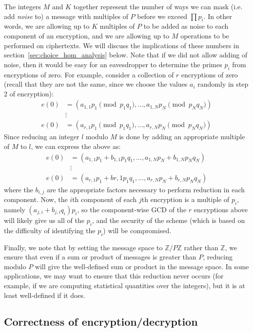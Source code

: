 \documentclass[11pt]{report}
\newcommand{\Z}{\mathbb{Z}}
\begin{document}
The integers $M$ and $K$ together represent the number of ways we can mask (i.e. add \emph{noise} to) a message with multiples of $P$ before we exceed $\prod p_i$. In other words, we are allowing up to $K$ multiples of $P$ to be added as noise to each component of an encryption, and we are allowing up to $M$ operations to be performed on ciphertexts. We will discuss the implications of these numbers in section~\ref{sec:choice_hom_analysis} below. Note that if we did not allow adding of noise, then it would be easy for an eavesdropper to determine the primes $p_i$ from encryptions of zero. For example, consider a collection of $r$ encryptions of zero (recall that they are not the same, since we choose the values $a_i$ randomly in step 2 of encryption):
\begin{align*}
e(0) &=  (a_{1,1}p_1 \pmod{p_1q_1},\dots,a_{1,N}p_N \pmod{p_Nq_N}) \\
\ &\vdots \ \\
e(0) &= (a_{r,1}p_1 \pmod{p_1q_1},\dots,a_{r,N}p_N \pmod{p_Nq_N})
\end{align*}
\noindent Since reducing an integer $l$ modulo $M$ is done by adding an appropriate multiple of $M$ to $l$, we can express the above as:
\begin{align*}
e(0) &= (a_{1,1}p_1+b_{1,1}p_1q_1,\dots,a_{1,N}p_N + b_{1,N}p_Nq_N) \\
\ &\vdots \\
e(0) &= (a_{r,1}p_1 + b{r,1}p_1q_1,\dots,a_{r,N}p_N + b_{r,N}p_Nq_N)
\end{align*}
\noindent where the $b_{i,j}$ are the appropriate factors necessary to perform reduction in each component. Now, the $i$th component of each $j$th encryption is a multiple of $p_i$, namely $(a_{j,i}+b_{j,i}q_i)p_i$, so the component-wise GCD of the $r$ encryptions above will likely give us all of the $p_i$, and the security of the scheme (which is based on the difficulty of identifying the $p_i$) will be compromised.

Finally, we note that by setting the message space to $\Z/P\Z$ rather than $\Z$, we ensure that even if a sum or product of messages is greater than $P$, reducing modulo $P$ will give the well-defined sum or product in the message space. In some applications, we may want to ensure that this reduction never occurs (for example, if we are computing statistical quantities over the integers), but it is at least well-defined if it does.

\subsection{Correctness of encryption/decryption}
\end{document}
